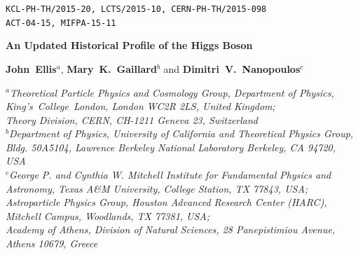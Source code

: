 \documentclass[12pt]{article}
\numberwithin{equation}{section}
\begin{document}
\def\thefootnote{\fnsymbol{footnote}}

\begin{flushright}
{\tt KCL-PH-TH/2015-20, LCTS/2015-10, CERN-PH-TH/2015-098} \\
{\tt ACT-04-15, MIFPA-15-11}
\end{flushright}

\vspace{0.7cm}
\begin{center}
{\bf {\Large An Updated Historical Profile of the Higgs Boson}}
\end{center}

\medskip

\begin{center}{\large
{\bf John~Ellis}$^{a}$,
{\bf Mary~K.~Gaillard}$^{b}$ and
{\bf Dimitri~V.~Nanopoulos}$^{c}$
}
\end{center}

\begin{center}
{\em $^a$Theoretical Particle Physics and Cosmology Group, Department of
  Physics, King's~College~London, London WC2R 2LS, United Kingdom;\\
Theory Division, CERN, CH-1211 Geneva 23,
  Switzerland}\\[0.2cm]

{\em $^b$Department of Physics, University of California and
Theoretical Physics Group, \\
Bldg. 50A5104, Lawrence Berkeley National Laboratory
Berkeley, CA 94720, USA}\\[0.2cm]

{\em $^c$George P. and Cynthia W. Mitchell Institute for Fundamental Physics and Astronomy,
Texas A\&M University, College Station, TX 77843, USA;\\
Astroparticle Physics Group, Houston Advanced Research Center (HARC), Mitchell Campus, Woodlands, TX 77381, USA;\\
Academy of Athens, Division of Natural Sciences,
28 Panepistimiou Avenue, Athens 10679, Greece}\\[0.2cm]\end{center}

\vspace{0.7cm}
\end{document}
